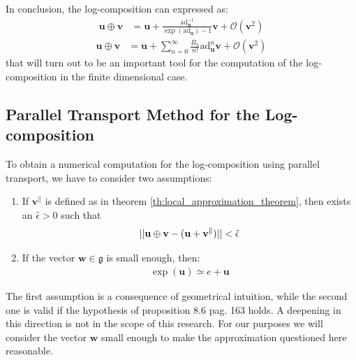 In conclusion, the log-composition can expressed as:
\begin{align*}
\mathbf{u}\oplus \mathbf{v}  
&= 
\mathbf{u} + 
\frac{  
	\text{ad}_{\mathbf{u}}^{-1} 
}{
\exp{(\text{ad}_{\mathbf{u}})}-1
} \mathbf{v}  
+ 
\mathcal{O}(\mathbf{v} ^2) 
\end{align*}
\begin{align}\label{eq:taylor}
\mathbf{u}\oplus \mathbf{v}  
&=
\mathbf{u} 
+
\sum_{n=0}^{\infty} \frac{B_{n}}{n!} \text{ad}_{\mathbf{u}}^{ n} 
\mathbf{v}  
+
\mathcal{O}(\mathbf{v} ^2)
\end{align}
that will turn out to be an important tool for the computation of the log-composition in the finite dimensional case. \\


\subsection{Parallel Transport Method for the Log-composition}
To obtain a numerical computation for the log-composition using parallel transport, we have to consider two assumptions: 
\begin{enumerate}
	\item If $\mathbf{v}^{\parallel} $ is defined as in theorem \ref{th:local_approximation_theorem}, then exists an $\hat{\epsilon} > 0$ such that
	\begin{align*}
	\vert\lvert 
		\mathbf{u}\oplus \mathbf{v}  
		-
		(
		\mathbf{u} + \mathbf{v}^{\parallel} 
		)
	 \rvert\vert <\hat{\epsilon}
	\end{align*}
	\item If the vector $\mathbf{w}\in\mathfrak{g}$ is small enough, then:
		\begin{align*}
		\exp(\mathbf{u}) \simeq e + \mathbf{u}
		\end{align*}
\end{enumerate}
The first assumption is a consequence of geometrical intuition, while
the second one is valid if the hypothesis of proposition 8.6 pag. 163 \cite{younes2010shapes} holds. A deepening in this direction is not in the scope of this research. For our purposes we will consider the vector $\mathbf{w}$ small enough to make the approximation questioned here reasonable.\\


